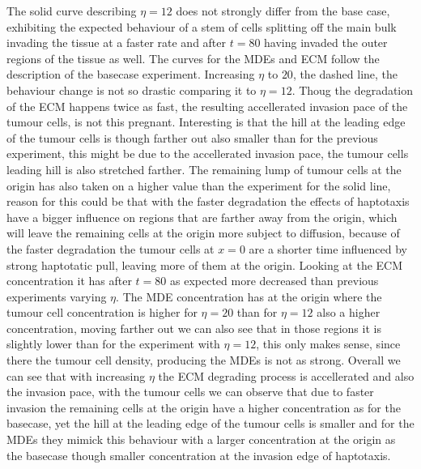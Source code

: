 The solid curve describing $\eta=12$ does not strongly differ from the base case, exhibiting the expected behaviour of a stem of cells splitting off the main bulk invading the tissue at a faster rate and after $t=80$ having invaded the outer regions of the tissue as well. The curves for the MDEs and ECM follow the description of the basecase experiment. 
Increasing $\eta$ to $20$, the dashed line, the behaviour change is not so drastic comparing it to $\eta=12$. Thoug the degradation of the ECM happens twice as fast, the resulting accellerated invasion pace of the tumour cells, is not this pregnant. Interesting is that the hill at the leading edge of the tumour cells is though farther out also smaller than for the previous experiment, this might be due to the accellerated invasion pace, the tumour cells leading hill is also stretched farther. The remaining lump of tumour cells at the origin has also taken on a higher value than the experiment for the solid line, reason for this could be that with the faster degradation the effects of haptotaxis have a bigger influence on regions that are farther away from the origin, which will leave the remaining cells at the origin more subject to diffusion, because of the faster degradation the tumour cells at $x=0$ are a shorter time influenced by strong haptotatic pull, leaving more of them at the origin. Looking at the ECM concentration it has after $t=80$ as expected more decreased than previous experiments varying $\eta$. The MDE concentration has at the origin where the tumour cell concentration is higher for $\eta=20$ than for $\eta=12$ also a higher concentration, moving farther out we can also see that in those regions it is slightly lower than for the experiment with $\eta=12$, this only makes sense, since there the tumour cell density, producing the MDEs is not as strong. 
Overall we can see that with increasing $\eta$ the ECM degrading process is accellerated and also the invasion pace, with the tumour cells we can observe that due to faster invasion the remaining cells at the origin have a higher concentration as for the basecase, yet the hill at the leading edge of the tumour cells is smaller and for the MDEs they mimick this behaviour with a larger concentration at the origin as the basecase though smaller concentration at the invasion edge of haptotaxis.

